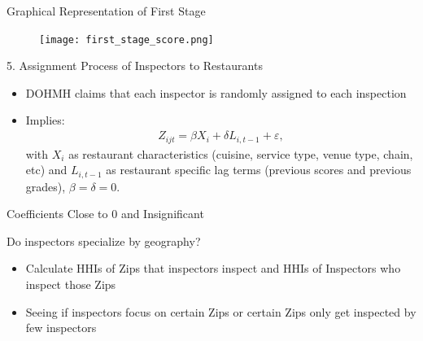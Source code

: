 \documentclass[handout]{beamer}
\begin{document}
\begin{frame}{Graphical Representation of First Stage}
    \begin{figure}
        \centering
        \texttt{[image: first\_stage\_score.png]}
    \end{figure}
\end{frame}

\begin{frame}{5. Assignment Process of Inspectors to Restaurants}
\begin{itemize}
\item DOHMH claims that each inspector is randomly assigned to each inspection
\item Implies: 
\begin{align*}
Z_{ijt} = \beta X_i + \delta L_{i,t-1} + \varepsilon,
\end{align*}
with $X_i$ as restaurant characteristics (cuisine, service type, venue type, chain, etc) and $L_{i,t-1}$ as restaurant specific lag terms (previous scores and previous grades), $\beta = \delta = 0$. 

\end{itemize}
\end{frame}

\begin{frame}{Coefficients Close to 0 and Insignificant}
\begin{table}
\scalebox{0.5}{
}
\end{table}
\end{frame}

\iffalse
\begin{frame}{Do inspectors specialize by geography?}
\begin{itemize}
\item Calculate HHIs of Zips that inspectors inspect and HHIs of Inspectors who inspect those Zips
\item Seeing if inspectors focus on certain Zips or certain Zips only get inspected by few inspectors
\end{itemize}
\end{frame}
\end{document}
